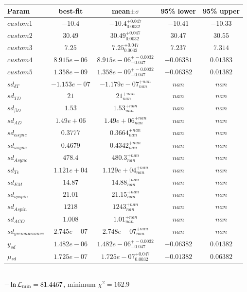 \begin{tabular}{|l|c|c|c|c|} 
 \hline 
Param & best-fit & mean$\pm\sigma$ & 95\% lower & 95\% upper \\ \hline 
$custom1$ &$-10.4$ & $-10.4_{0.0032}^{+0.047}$ & $-10.41$ & $-10.33$ \\ 
$custom2$ &$30.49$ & $30.49_{0.0032}^{+0.047}$ & $30.47$ & $30.55$ \\ 
$custom3$ &$7.25$ & $7.25_{0.0032}^{+0.047}$ & $7.237$ & $7.314$ \\ 
$custom4$ &$8.915e-06$ & $8.915e-06_{-0.047}^{+-0.0032}$ & $-0.06381$ & $0.01383$ \\ 
$custom5$ &$1.358e-09$ & $1.358e-09_{-0.047}^{+-0.0032}$ & $-0.06382$ & $0.01382$ \\ 
$sd_{\delta{} T }$ &$-1.153e-07$ & $-1.179e-07_{nan}^{+nan}$ & $nan$ & $nan$ \\ 
$sd_{T D }$ &$21$ & $21_{nan}^{+nan}$ & $nan$ & $nan$ \\ 
$sd_{\beta{} D }$ &$1.53$ & $1.53_{nan}^{+nan}$ & $nan$ & $nan$ \\ 
$sd_{A D }$ &$1.49e+06$ & $1.49e+06_{nan}^{+nan}$ & $nan$ & $nan$ \\ 
$sd_{\alpha{} sync }$ &$0.3777$ & $0.3664_{nan}^{+nan}$ & $nan$ & $nan$ \\ 
$sd_{\omega{} sync }$ &$0.4679$ & $0.4342_{nan}^{+nan}$ & $nan$ & $nan$ \\ 
$sd_{A sync }$ &$478.4$ & $480.3_{nan}^{+nan}$ & $nan$ & $nan$ \\ 
$sd_{T e }$ &$1.121e+04$ & $1.129e+04_{nan}^{+nan}$ & $nan$ & $nan$ \\ 
$sd_{EM }$ &$14.87$ & $14.88_{nan}^{+nan}$ & $nan$ & $nan$ \\ 
$sd_{\nu{} p spin }$ &$21.01$ & $21.15_{nan}^{+nan}$ & $nan$ & $nan$ \\ 
$sd_{A spin }$ &$1218$ & $1243_{nan}^{+nan}$ & $nan$ & $nan$ \\ 
$sd_{A CO }$ &$1.008$ & $1.01_{nan}^{+nan}$ & $nan$ & $nan$ \\ 
$sd_{y reio nuisance }$ &$2.745e-07$ & $2.748e-07_{nan}^{+nan}$ & $nan$ & $nan$ \\ 
$y_{sd }$ &$1.482e-06$ & $1.482e-06_{-0.047}^{+-0.0032}$ & $-0.06382$ & $0.01382$ \\ 
$\mu{}_{sd }$ &$1.725e-07$ & $1.725e-07_{0.0032}^{+0.047}$ & $-0.01382$ & $0.06382$ \\ 
\hline 
 \end{tabular} \\ 
$-\ln{\cal L}_\mathrm{min} =81.4467$, minimum $\chi^2=162.9$ \\ 
